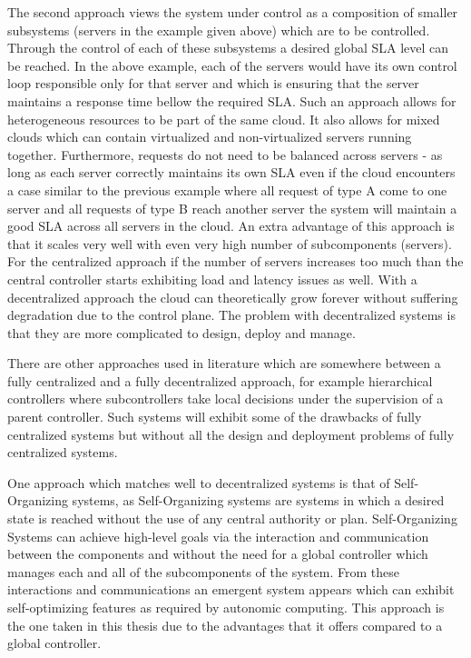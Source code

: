 The second approach views the system under control as a composition of smaller subsystems (servers in the example given above) which are to be controlled. Through the control of each of these subsystems a desired global SLA level can be reached. In the above example, each of the servers would have its own control loop responsible only for that server and which is ensuring that the server maintains a response time bellow the required SLA. Such an approach allows for heterogeneous resources to be part of the same cloud. It also allows for mixed clouds which can contain virtualized and non-virtualized servers running together. Furthermore, requests do not need to be balanced across servers - as long as each server correctly maintains its own SLA even if the cloud encounters a case similar to the previous example where all request of type A come to one server and all requests of type B reach another server the system will maintain a good SLA across all servers in the cloud. An extra advantage of this approach is that it scales very well with even very high number of subcomponents (servers). For the centralized approach if the number of servers increases too much than the central controller starts exhibiting load and latency issues as well. With a decentralized approach the cloud can theoretically grow forever without suffering degradation due to the control plane. The problem with decentralized systems is that they are more complicated to design, deploy and manage.

There are other approaches used in literature which are somewhere between a fully centralized and a fully decentralized approach, for example hierarchical controllers where subcontrollers take local decisions under the supervision of a parent controller. Such systems will exhibit some of the drawbacks of fully centralized systems but without all the design and deployment problems of fully centralized systems.

One approach which matches well to decentralized systems is that of Self-Organizing systems, as Self-Organizing systems are systems in which a desired state is reached without the use of any central authority or plan. Self-Organizing Systems can achieve high-level goals via the interaction and communication between the components and without the need for a global controller which manages each and all of the subcomponents of the system. From these interactions and communications an emergent system appears which can exhibit self-optimizing features as required by autonomic computing. This approach is the one taken in this thesis due to the advantages that it offers compared to a global controller.

